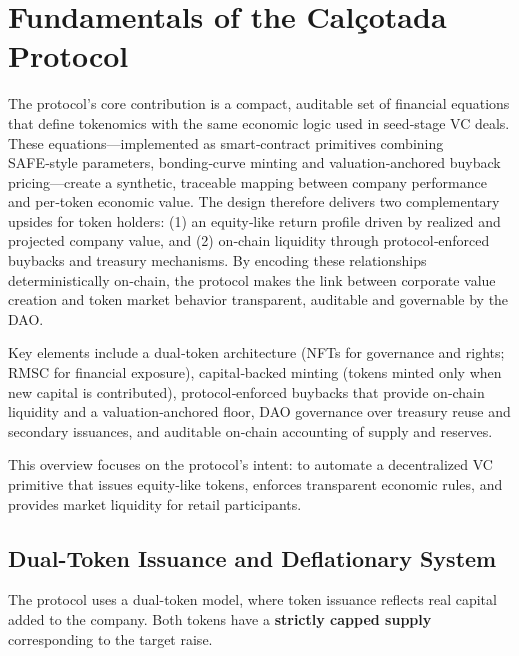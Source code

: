 \documentclass[conference]{IEEEtran}
\begin{document}
\section{Fundamentals of the Calçotada Protocol}

The protocol's core contribution is a compact, auditable set of financial equations that define tokenomics with the same economic logic used in seed‑stage VC deals. These equations—implemented as smart‑contract primitives combining SAFE‑style parameters, bonding‑curve minting and valuation‑anchored buyback pricing—create a synthetic, traceable mapping between company performance and per‑token economic value. The design therefore delivers two complementary upsides for token holders: (1) an equity‑like return profile driven by realized and projected company value, and (2) on‑chain liquidity through protocol‑enforced buybacks and treasury mechanisms. By encoding these relationships deterministically on‑chain, the protocol makes the link between corporate value creation and token market behavior transparent, auditable and governable by the DAO.

Key elements include a dual‑token architecture (NFTs for governance and rights; RMSC for financial exposure), capital‑backed minting (tokens minted only when new capital is contributed), protocol‑enforced buybacks that provide on‑chain liquidity and a valuation‑anchored floor, DAO governance over treasury reuse and secondary issuances, and auditable on‑chain accounting of supply and reserves.

This overview focuses on the protocol’s intent: to automate a decentralized VC primitive that issues equity‑like tokens, enforces transparent economic rules, and provides market liquidity for retail participants.

\subsection{Dual-Token Issuance and Deflationary System}

The protocol uses a dual-token model, where token issuance reflects real capital added to the company. Both tokens have a \textbf{strictly capped supply} corresponding to the target raise.
\end{document}
